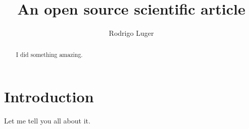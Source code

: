 \documentclass[twocolumn]{aastex631}
\begin{document}
\title{An open source scientific article}

\author{Rodrigo Luger}

\begin{abstract}
    I did something amazing.
\end{abstract}

\section{Introduction}
Let me tell you all about it.
\end{document}
